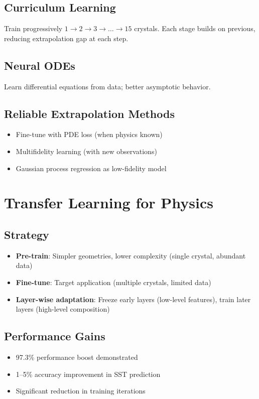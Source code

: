 \subsection{Curriculum Learning}
Train progressively $1 \rightarrow 2 \rightarrow 3 \rightarrow \ldots \rightarrow 15$ crystals. Each stage builds on previous, reducing extrapolation gap at each step.

\subsection{Neural ODEs}
Learn differential equations from data; better asymptotic behavior.

\subsection{Reliable Extrapolation Methods}
\begin{itemize}
    \item Fine-tune with PDE loss (when physics known)
    \item Multifidelity learning (with new observations)
    \item Gaussian process regression as low-fidelity model
\end{itemize}

\section{Transfer Learning for Physics}

\subsection{Strategy}
\begin{itemize}
    \item \textbf{Pre-train}: Simpler geometries, lower complexity (single crystal, abundant data)
    \item \textbf{Fine-tune}: Target application (multiple crystals, limited data)
    \item \textbf{Layer-wise adaptation}: Freeze early layers (low-level features), train later layers (high-level composition)
\end{itemize}

\subsection{Performance Gains}
\begin{itemize}
    \item 97.3\% performance boost demonstrated \cite{pellegrin2022}
    \item 1--5\% accuracy improvement in SST prediction
    \item Significant reduction in training iterations
\end{itemize}

